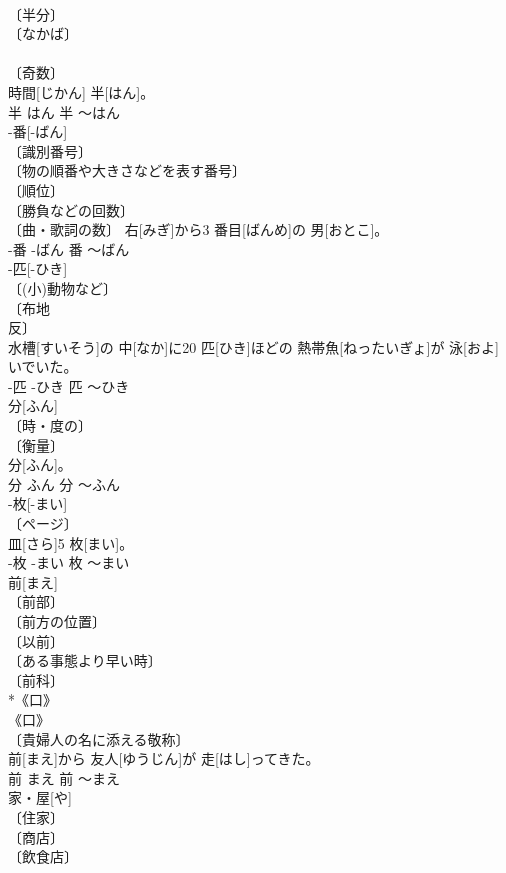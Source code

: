 \documentclass[8pt]{extreport}
\begin{document}
\begin{CJK}{UTF8}{min}
\\	〔半分〕 
\\	〔なかば〕 
\\	[⇒はん-２] 
\\	〔奇数〕 
\\	時間[じかん] 半[はん]。	
\\	半	はん	半	〜はん	
\\	-番[-ばん]	
\\	〔識別番号〕 
\\	〔物の順番や大きさなどを表す番号〕 
\\	〔順位〕 
\\	〔勝負などの回数〕 
\\	〔曲・歌詞の数〕	右[みぎ]から3 番目[ばんめ]の 男[おとこ]。	
\\	-番	-ばん	番	〜ばん	
\\	-匹[-ひき]	
\\	〔(小)動物など〕 
\\	〔布地 
\\	反〕 
\\	水槽[すいそう]の 中[なか]に20 匹[ひき]ほどの 熱帯魚[ねったいぎょ]が 泳[およ]いでいた。	
\\	-匹	-ひき	匹	〜ひき	
\\	分[ふん]	
\\	〔時・度の〕 
\\	〔衡量〕 
\\	分[ふん]。	
\\	分	ふん	分	〜ふん	
\\	-枚[-まい]	
\\	〔ページ〕 
\\	皿[さら]5 枚[まい]。	
\\	-枚	-まい	枚	〜まい	
\\	前[まえ]	
\\	〔前部〕 
\\	〔前方の位置〕 
\\	〔以前〕 
\\	〔ある事態より早い時〕 
\\	〔前科〕 
\\	*《口》 
\\	《口》 
\\	〔貴婦人の名に添える敬称〕 
\\	前[まえ]から 友人[ゆうじん]が 走[はし]ってきた。	
\\	前	まえ	前	〜まえ	
\\	家・屋[や]	
\\	〔住家〕 
\\	〔商店〕 
\\	〔飲食店〕 

\end{CJK}
\end{document}
